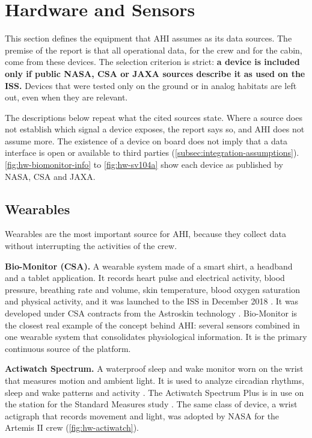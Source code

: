 \section{Hardware and Sensors}
\label{sec:hardware-sensors}

This section defines the equipment that AHI assumes as its data sources. The premise of the report is that all operational data, for the crew and for the cabin, come from these devices. The selection criterion is strict: \textbf{a device is included only if public NASA, CSA or JAXA sources describe it as used on the ISS.} Devices that were tested only on the ground or in analog habitats are left out, even when they are relevant.

The descriptions below repeat what the cited sources state. Where a source does not establish which signal a device exposes, the report says so, and AHI does not assume more. The existence of a device on board does not imply that a data interface is open or available to third parties (\ref{subsec:integration-assumptions}). \ref{fig:hw-biomonitor-info} to \ref{fig:hw-sv104a} show each device as published by NASA, CSA and JAXA.

\subsection{Wearables}
\label{subsec:wearables}

Wearables are the most important source for AHI, because they collect data without interrupting the activities of the crew.

\medskip\noindent\textbf{Bio-Monitor (CSA).} A wearable system made of a smart shirt, a headband and a tablet application. It records heart pulse and electrical activity, blood pressure, breathing rate and volume, skin temperature, blood oxygen saturation and physical activity, and it was launched to the ISS in December 2018 \cite{canadian_space_agency_biomonitor}. It was developed under CSA contracts from the Astroskin technology \cite{csa_wireless_body_sensors}. Bio-Monitor is the closest real example of the concept behind AHI: several sensors combined in one wearable system that consolidates physiological information. It is the primary continuous source of the platform.

\medskip\noindent\textbf{Actiwatch Spectrum.} A waterproof sleep and wake monitor worn on the wrist that measures motion and ambient light. It is used to analyze circadian rhythms, sleep and wake patterns and activity \cite{nasa_issmp_hardware,nasa_wearable_tech_iss}. The Actiwatch Spectrum Plus is in use on the station for the Standard Measures study \cite{nasa_sleep_on_station}. The same class of device, a wrist actigraph that records movement and light, was adopted by NASA for the Artemis II crew (\ref{fig:hw-actiwatch}).

